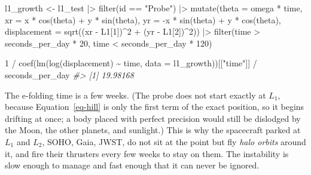 \documentclass[
  10.5pt,
  letterpaper,
]{scrbook}
\newenvironment{Shaded}{\begin{snugshade}}{\end{snugshade}}
\newcommand{\AttributeTok}[1]{\textcolor[rgb]{0.00,0.00,0.00}{#1}}
\newcommand{\CommentTok}[1]{\textcolor[rgb]{0.00,0.00,0.00}{\textit{#1}}}
\newcommand{\DecValTok}[1]{\textcolor[rgb]{0.00,0.00,0.00}{#1}}
\newcommand{\FunctionTok}[1]{\textcolor[rgb]{0.00,0.00,0.00}{#1}}
\newcommand{\NormalTok}[1]{\textcolor[rgb]{0.00,0.00,0.00}{#1}}
\newcommand{\OtherTok}[1]{\textcolor[rgb]{0.00,0.00,0.00}{#1}}
\newcommand{\SpecialCharTok}[1]{\textcolor[rgb]{0.00,0.00,0.00}{#1}}
\newcommand{\StringTok}[1]{\textcolor[rgb]{0.00,0.00,0.00}{#1}}
\theoremstyle{definition}
\theoremstyle{plain}
\theoremstyle{remark}
\begin{document}
\begin{Shaded}
\begin{Highlighting}[]
\NormalTok{l1\_growth }\OtherTok{\textless{}{-}}\NormalTok{ l1\_test }\SpecialCharTok{|\textgreater{}}
  \FunctionTok{filter}\NormalTok{(id }\SpecialCharTok{==} \StringTok{"Probe"}\NormalTok{) }\SpecialCharTok{|\textgreater{}}
  \FunctionTok{mutate}\NormalTok{(}\AttributeTok{theta =}\NormalTok{ omega }\SpecialCharTok{*}\NormalTok{ time,}
         \AttributeTok{xr =}\NormalTok{  x }\SpecialCharTok{*} \FunctionTok{cos}\NormalTok{(theta) }\SpecialCharTok{+}\NormalTok{ y }\SpecialCharTok{*} \FunctionTok{sin}\NormalTok{(theta),}
         \AttributeTok{yr =} \SpecialCharTok{{-}}\NormalTok{x }\SpecialCharTok{*} \FunctionTok{sin}\NormalTok{(theta) }\SpecialCharTok{+}\NormalTok{ y }\SpecialCharTok{*} \FunctionTok{cos}\NormalTok{(theta),}
         \AttributeTok{displacement =} \FunctionTok{sqrt}\NormalTok{((xr }\SpecialCharTok{{-}}\NormalTok{ L1[}\DecValTok{1}\NormalTok{])}\SpecialCharTok{\^{}}\DecValTok{2} \SpecialCharTok{+}\NormalTok{ (yr }\SpecialCharTok{{-}}\NormalTok{ L1[}\DecValTok{2}\NormalTok{])}\SpecialCharTok{\^{}}\DecValTok{2}\NormalTok{)) }\SpecialCharTok{|\textgreater{}}
  \FunctionTok{filter}\NormalTok{(time }\SpecialCharTok{\textgreater{}}\NormalTok{ seconds\_per\_day }\SpecialCharTok{*} \DecValTok{20}\NormalTok{, time }\SpecialCharTok{\textless{}}\NormalTok{ seconds\_per\_day }\SpecialCharTok{*} \DecValTok{120}\NormalTok{)}

\DecValTok{1} \SpecialCharTok{/} \FunctionTok{coef}\NormalTok{(}\FunctionTok{lm}\NormalTok{(}\FunctionTok{log}\NormalTok{(displacement) }\SpecialCharTok{\textasciitilde{}}\NormalTok{ time, }\AttributeTok{data =}\NormalTok{ l1\_growth))[[}\StringTok{"time"}\NormalTok{]] }\SpecialCharTok{/}\NormalTok{ seconds\_per\_day}
\CommentTok{\#\textgreater{} [1] 19.98168}
\end{Highlighting}
\end{Shaded}

The e-folding time is a few weeks. (The probe does not start exactly at
\(L_1\), because Equation~\ref{eq-hill} is only the first term of the
exact position, so it begins drifting at once; a body placed with
perfect precision would still be dislodged by the Moon, the other
planets, and sunlight.) This is why the spacecraft parked at \(L_1\) and
\(L_2\), SOHO, Gaia, JWST, do not sit at the point but fly \emph{halo
orbits} around it, and fire their thrusters every few weeks to stay on
them. The instability is slow enough to manage and fast enough that it
can never be ignored.
\end{document}
